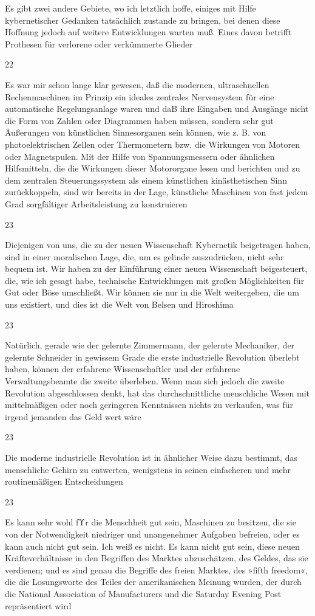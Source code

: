 \documentclass[
  letterpaper,
  DIV=11,
  numbers=noendperiod]{scrartcl}
\begin{document}
Es gibt zwei andere Gebiete, wo ich letztlich hoffe, einiges mit Hilfe
kybernetischer Gedanken tatsächlich zustande zu bringen, bei denen diese
Hoffnung jedoch auf weitere Entwicklungen warten muß. Eines davon
betrifft Prothesen für verlorene oder verkümmerte Glieder

22

Es war mir schon lange klar gewesen, daß die modernen, ultraschnellen
Rechenmaschinen im Prinzip ein ideales zentrales Nervensystem für eine
automatische Regelungsanlage waren und daB ihre Eingaben und Ausgänge
nicht die Form von Zahlen oder Diagrammen haben müssen, sondern sehr gut
Äußerungen von künstlichen Sinnesorganen sein können, wie z. B. von
photoelektrischen Zellen oder Thermometern bzw. die Wirkungen von
Motoren oder Magnetspulen. Mit der Hilfe von Spannungsmessern oder
ähnlichen Hilfsmitteln, die die Wirkungen dieser Motororgane lesen und
berichten und zu dem zentralen Steuerungssystem als einem künstlichen
kinästhetischen Sinn zurückkoppeln, sind wir bereits in der Lage,
künstliche Maschinen von fast jedem Grad sorgfältiger Arbeitsleistung zu
konstruieren

23

Diejenigen von uns, die zu der neuen Wissenschaft Kybernetik beigetragen
haben, sind in einer moralischen Lage, die, um es gelinde auszudrücken,
nicht sehr bequem ist. Wir haben zu der Einführung einer neuen
Wissenschaft beigesteuert, die, wie ich gesagt habe, technische
Entwicklungen mit großen Möglichkeiten für Gut oder Böse umschließt. Wir
können sie nur in die Welt weitergeben, die um uns existiert, und dies
ist die Welt von Belsen und Hiroshima

23

Natürlich, gerade wie der gelernte Zimmermann, der gelernte Mechaniker,
der gelernte Schneider in gewissem Grade die erste industrielle
Revolution überlebt haben, können der erfahrene Wissenschaftler und der
erfahrene Verwaltungsbeamte die zweite überleben. Wenn man sich jedoch
die zweite Revolution abgeschlossen denkt, hat das durchschnittliche
menschliche Wesen mit mittelmäßigen oder noch geringeren Kenntnissen
nichts zu verkaufen, was für irgend jemanden das Geld wert wäre

23

Die moderne industrielle Revolution ist in ähnlicher Weise dazu
bestimmt, das menschliche Gehirn zu entwerten, wenigstens in seinen
einfacheren und mehr routinemäßigen Entscheidungen

23

Es kann sehr wohl fΥr die Menschheit gut sein, Maschinen zu besitzen,
die sie von der Notwendigkeit niedriger und unangenehmer Aufgaben
befreien, oder es kann auch nicht gut sein. Ich weiß es nicht. Es kann
nicht gut sein, diese neuen Kräfteverhältnisse in den Begriffen des
Marktes abzuschätzen, des Geldes, das sie verdienen; und es sind genau
die Begriffe des freien Marktes, des »fifth freedom«, die die
Losungsworte des Teiles der amerikanischen Meinung wurden, der durch die
National Association of Manufacturers und die Saturday Evening Post
repräsentiert wird
\end{document}

